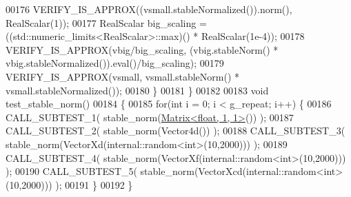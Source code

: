\begin{DoxyCode}
00176     VERIFY\_IS\_APPROX((vsmall.stableNormalized()).norm(), RealScalar(1));
00177     RealScalar big\_scaling = ((std::numeric\_limits<RealScalar>::max)() * RealScalar(1e-4));
00178     VERIFY\_IS\_APPROX(vbig/big\_scaling, (vbig.stableNorm() * vbig.stableNormalized()).eval()/big\_scaling);
00179     VERIFY\_IS\_APPROX(vsmall, vsmall.stableNorm() * vsmall.stableNormalized());
00180   \}
00181 \}
00182 
00183 \textcolor{keywordtype}{void} test\_stable\_norm()
00184 \{
00185   \textcolor{keywordflow}{for}(\textcolor{keywordtype}{int} i = 0; i < g\_repeat; i++) \{
00186     CALL\_SUBTEST\_1( stable\_norm(\hyperlink{group___core___module_class_eigen_1_1_matrix}{Matrix<float, 1, 1>}()) );
00187     CALL\_SUBTEST\_2( stable\_norm(Vector4d()) );
00188     CALL\_SUBTEST\_3( stable\_norm(VectorXd(internal::random<int>(10,2000))) );
00189     CALL\_SUBTEST\_4( stable\_norm(VectorXf(internal::random<int>(10,2000))) );
00190     CALL\_SUBTEST\_5( stable\_norm(VectorXcd(internal::random<int>(10,2000))) );
00191   \}
00192 \}
\end{DoxyCode}

